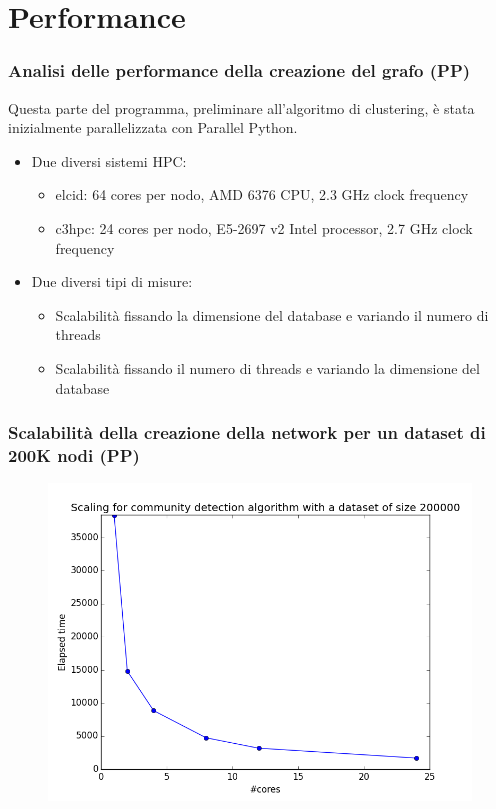 \documentclass{beamer}
\begin{document}
\section{Performance}
\frame{\sectionpage}
\begin{frame}
\frametitle{Analisi delle performance della creazione del grafo (PP)}
Questa parte del programma, preliminare all'algoritmo di clustering, è stata inizialmente parallelizzata con Parallel Python.
\begin{itemize}
\item Due diversi sistemi HPC:
\begin{itemize}
\item elcid: 64 cores per nodo, AMD 6376 CPU, 2.3 GHz clock frequency
\item c3hpc: 24 cores per nodo, E5-2697 v2 Intel processor, 2.7 GHz clock frequency
\end{itemize}
\item Due diversi tipi di misure:
\begin{itemize}
\item Scalabilità fissando la dimensione del database e variando il numero di threads
\item Scalabilità fissando il numero di threads e variando la dimensione del database
\end{itemize}
\end{itemize}
\end{frame}
\begin{frame}
 \frametitle{Scalabilità della creazione della network per un dataset di 200K nodi (PP)}
  \begin{figure}[htbp]
\centering
\includegraphics[height=6.0 cm,width=10 cm]{label_200K.png}

\end{figure}
\end{frame}
\end{document}
